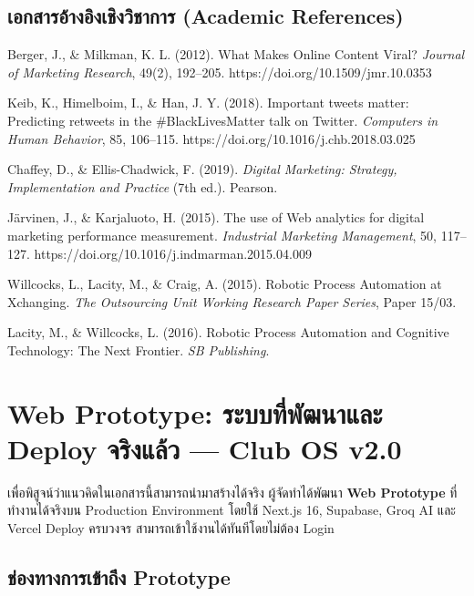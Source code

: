 \documentclass[10pt,a4paper]{article}
\begin{document}
\subsection{เอกสารอ้างอิงเชิงวิชาการ (Academic References)}
\begin{enumerate}[label={[\arabic*]}]
  \item Berger, J., \& Milkman, K. L. (2012). What Makes Online Content Viral? \textit{Journal of Marketing Research}, 49(2), 192--205. https://doi.org/10.1509/jmr.10.0353
  \item Keib, K., Himelboim, I., \& Han, J. Y. (2018). Important tweets matter: Predicting retweets in the \#BlackLivesMatter talk on Twitter. \textit{Computers in Human Behavior}, 85, 106--115. https://doi.org/10.1016/j.chb.2018.03.025
  \item Chaffey, D., \& Ellis-Chadwick, F. (2019). \textit{Digital Marketing: Strategy, Implementation and Practice} (7th ed.). Pearson.
  \item Järvinen, J., \& Karjaluoto, H. (2015). The use of Web analytics for digital marketing performance measurement. \textit{Industrial Marketing Management}, 50, 117--127. https://doi.org/10.1016/j.indmarman.2015.04.009
  \item Willcocks, L., Lacity, M., \& Craig, A. (2015). Robotic Process Automation at Xchanging. \textit{The Outsourcing Unit Working Research Paper Series}, Paper 15/03.
  \item Lacity, M., \& Willcocks, L. (2016). Robotic Process Automation and Cognitive Technology: The Next Frontier. \textit{SB Publishing}.
\end{enumerate}

\newpage

\section{Web Prototype: ระบบที่พัฒนาและ Deploy จริงแล้ว — Club OS v2.0}

\noindent เพื่อพิสูจน์ว่าแนวคิดในเอกสารนี้สามารถนำมาสร้างได้จริง ผู้จัดทำได้พัฒนา \textbf{Web Prototype} ที่ทำงานได้จริงบน Production Environment โดยใช้ Next.js 16, Supabase, Groq AI และ Vercel Deploy ครบวงจร สามารถเข้าใช้งานได้ทันทีโดยไม่ต้อง Login

\subsection{ช่องทางการเข้าถึง Prototype}
\end{document}
